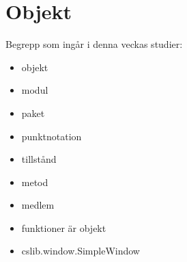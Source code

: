 \chapter{Objekt}\label{chapter:W04}
Begrepp som ingår i denna veckas studier:
\begin{itemize}[noitemsep,label={$\square$},leftmargin=*]
\item objekt
\item modul
\item paket
\item punktnotation
\item tillstånd
\item metod
\item medlem
\item funktioner är objekt
\item cslib.window.SimpleWindow\end{itemize}
